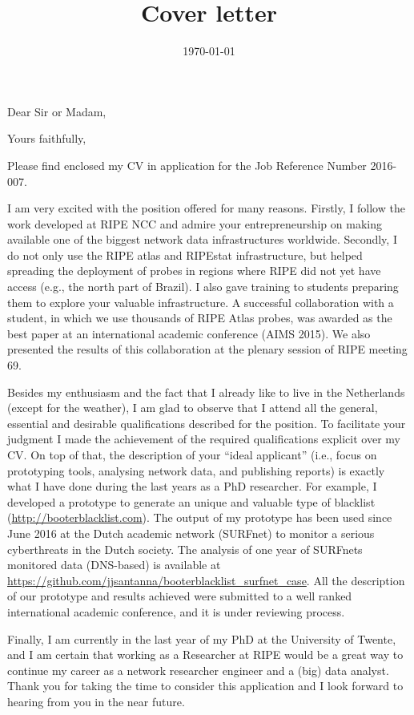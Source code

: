 \documentclass[11pt,a4paper,sans]{moderncv}        %
\title{Cover letter}
\begin{document}
\date{\today}
\opening{Dear Sir or Madam,}
\closing{Yours faithfully,}

\makelettertitle

\justify
Please find enclosed my CV in application for the Job Reference Number 2016-007.

I am very excited with the position offered for many reasons. Firstly, I follow the work developed at RIPE NCC and admire your entrepreneurship on making available one of the biggest network data infrastructures worldwide. Secondly, I do not only use the RIPE atlas and RIPEstat infrastructure, but helped spreading the deployment of probes in regions where RIPE did not yet have access (e.g., the north part of Brazil). I also gave training to students preparing them to explore your valuable infrastructure. A successful collaboration with a student, in which we use thousands of RIPE Atlas probes, was awarded as the best paper at an international academic conference (AIMS 2015). We also presented the results of this collaboration at the plenary session of RIPE meeting 69.

Besides my enthusiasm and the fact that I already like to live in the Netherlands (except for the weather), I am glad to observe that I attend all the general, essential and desirable qualifications described for the position. To facilitate your judgment I made the achievement of the required qualifications explicit over my CV. On top of that, the description of your ``ideal applicant'' (i.e., focus on prototyping tools, analysing network data, and publishing reports) is exactly what I have done during the last years as a PhD researcher. For example, I developed a prototype to generate an unique and valuable type of blacklist (\url{http://booterblacklist.com}). The output of my prototype has been used since June 2016 at the Dutch academic network (SURFnet) to monitor a serious cyberthreats in the Dutch society. The analysis of one year of SURFnets monitored data (DNS-based) is available at \url{https://github.com/jjsantanna/booterblacklist_surfnet_case}. All the description of our prototype and results achieved were submitted to a well ranked international academic conference, and it is under reviewing process.

Finally, I am currently in the last year of my PhD at the University of Twente, and I am certain that working as a Researcher at RIPE would be a great way to continue my career as a network researcher engineer and a (big) data analyst. Thank you for taking the time to consider this application and I look forward to hearing from you in the near future.


\makeletterclosing
\end{document}
